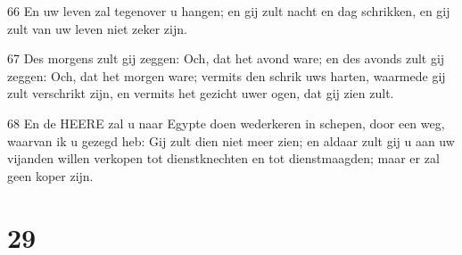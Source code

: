 \par 66 En uw leven zal tegenover u hangen; en gij zult nacht en dag schrikken, en gij zult van uw leven niet zeker zijn.
\par 67 Des morgens zult gij zeggen: Och, dat het avond ware; en des avonds zult gij zeggen: Och, dat het morgen ware; vermits den schrik uws harten, waarmede gij zult verschrikt zijn, en vermits het gezicht uwer ogen, dat gij zien zult.
\par 68 En de HEERE zal u naar Egypte doen wederkeren in schepen, door een weg, waarvan ik u gezegd heb: Gij zult dien niet meer zien; en aldaar zult gij u aan uw vijanden willen verkopen tot dienstknechten en tot dienstmaagden; maar er zal geen koper zijn.

\chapter{29}

